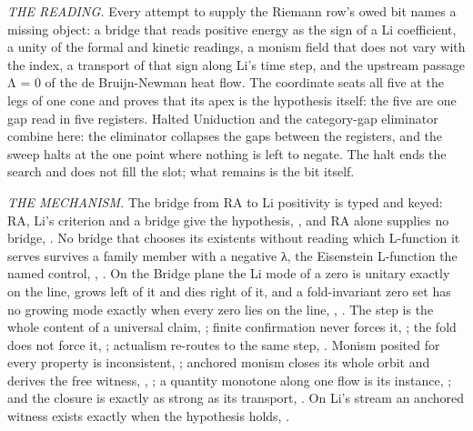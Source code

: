\documentclass[10pt,twocolumn]{article}
\begin{document}
\emph{THE READING.} Every attempt to supply the Riemann row's owed bit
names a missing object: a bridge that reads positive energy as the sign
of a Li coefficient, a unity of the formal and kinetic readings, a
monism field that does not vary with the index, a transport of that sign
along Li's time step, and the upstream passage Λ = 0 of the de
Bruijn-Newman heat flow. The coordinate seats all five at the legs of
one cone and proves that its apex is the hypothesis itself: the five are
one gap read in five registers. Halted Uniduction and the category-gap
eliminator combine here: the eliminator collapses the gaps between the
registers, and the sweep halts at the one point where nothing is left to
negate. The halt ends the search and does not fill the slot; what
remains is the bit itself.

\emph{THE MECHANISM.} The bridge from RA to Li positivity is typed and
keyed: RA, Li's criterion and a bridge give the hypothesis,
\texttt{}, and RA alone supplies no
bridge, \texttt{}. No bridge that
chooses its existents without reading which L-function it serves
survives a family member with a negative λ, the Eisenstein L-function
the named control, \texttt{},
\texttt{}. On the Bridge plane
the Li mode of a zero is unitary exactly on the line, grows left of it
and dies right of it, and a fold-invariant zero set has no growing mode
exactly when every zero lies on the line,
\texttt{},
\texttt{}. The step is the whole
content of a universal claim,
\texttt{}; finite confirmation
never forces it, \texttt{}; the
fold does not force it,
\texttt{}; actualism re-routes
to the same step, \texttt{}. Monism
posited for every property is inconsistent,
\texttt{}; anchored monism
closes its whole orbit and derives the free witness,
\texttt{},
\texttt{}; a quantity monotone
along one flow is its instance,
\texttt{}; and the closure is
exactly as strong as its transport,
\texttt{}. On Li's
stream an anchored witness exists exactly when the hypothesis holds,
\texttt{}.
\end{document}
